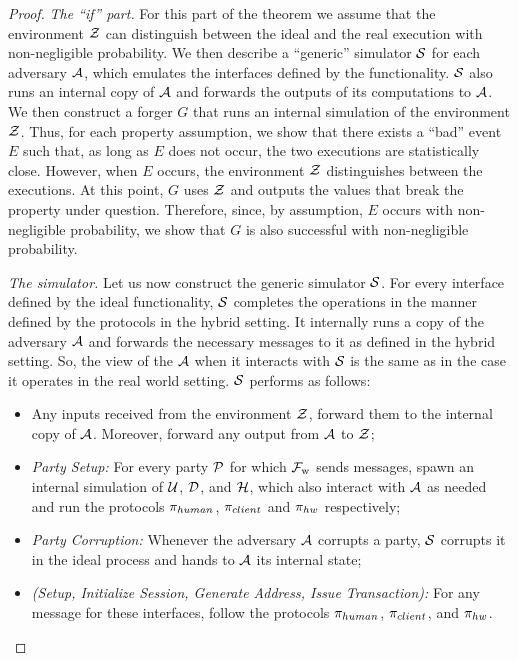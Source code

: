 \begin{proof}
    \emph{The ``if'' part.}
    For this part of the theorem we assume that the environment $\mathcal{Z}$ can
    distinguish between the ideal and the real execution with non-negligible
    probability. We then describe a ``generic'' simulator $\mathcal{S}$ for each
    adversary $\mathcal{A}$, which emulates the interfaces defined by the
    functionality.  $\mathcal{S}$ also runs an internal copy of $\mathcal{A}$ and forwards
    the outputs of its computations to $\mathcal{A}$. We then construct a forger
    $G$ that runs an internal simulation of the environment $\mathcal{Z}$. Thus, for
    each property assumption, we show that there exists a ``bad'' event $E$
    such that, as long as $E$ does not occur, the two executions are
    statistically close. However, when $E$ occurs, the environment $\mathcal{Z}$
    distinguishes between the executions. At this point, $G$ uses $\mathcal{Z}$ and
    outputs the values that break the property under question. Therefore, since,
    by assumption, $E$ occurs with non-negligible probability, we show that $G$
    is also successful with non-negligible probability.

    \emph{The simulator.}
    Let us now construct the generic simulator $\mathcal{S}$. For every
    interface defined by the ideal functionality, $\mathcal{S}$ completes the
    operations in the manner defined by the protocols in the hybrid setting. It
    internally runs a copy of the adversary $\mathcal{A}$ and forwards the
    necessary messages to it as defined in the hybrid setting. So, the view of
    the $\mathcal{A}$ when it interacts with $\mathcal{S}$ is the same as in the
    case it operates in the real world setting. $\mathcal{S}$ performs as
    follows:
    \begin{itemize}
        \item Any inputs received from the environment $\mathcal{Z}$, forward them to
            the internal copy of $\mathcal{A}$. Moreover, forward any output from
            $\mathcal{A}$ to $\mathcal{Z}$;
        \item \emph{Party Setup:} For every party $\mathcal{P}$ for which $\mathcal{F}_{\mathrm{w}}$
            sends messages, spawn an internal simulation of $\mathcal{U}$, $\mathcal{D}$,
            and $\mathcal{H}$, which also interact with $\mathcal{A}$ as needed
            and run the protocols $\pi_{human}$, $\pi_{client}$ and $\pi_{hw}$ respectively;
        \item \emph{Party Corruption:} Whenever the adversary $\mathcal{A}$
            corrupts a party, $\mathcal{S}$ corrupts it in the ideal process and hands to
            $\mathcal{A}$ its internal state;
        \item \emph{(Setup, Initialize Session, Generate Address, Issue
            Transaction):} For any message for these interfaces, follow the
            protocols $\pi_{human}$, $\pi_{client}$, and $\pi_{hw}$.
     \end{itemize}


\end{proof}
